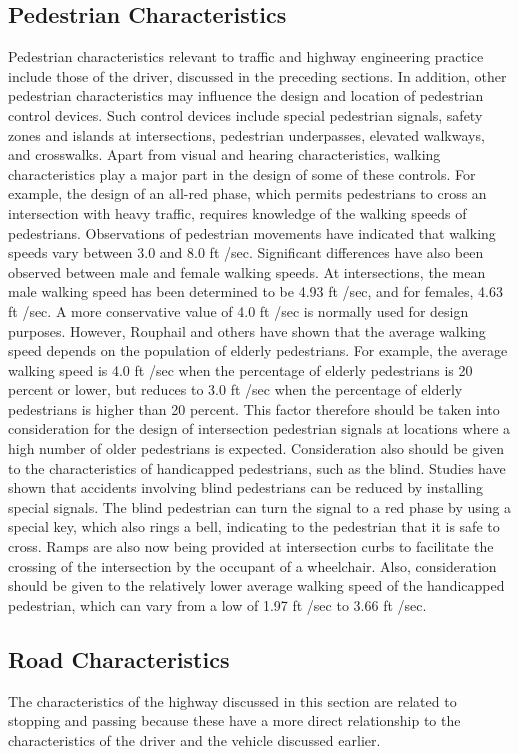 \subsection{Pedestrian Characteristics}
Pedestrian characteristics relevant to traffic and highway engineering practice include those of the driver, discussed in the preceding sections. In addition, other pedestrian characteristics may influence the design and location of pedestrian control devices. Such control devices include special pedestrian signals, safety zones and islands at intersections, pedestrian underpasses, elevated walkways, and crosswalks. Apart from visual and hearing characteristics, walking characteristics play a major part in the design of some of these controls. For example, the design of an all-red phase, which permits pedestrians to cross an intersection with heavy traffic, requires knowledge of the walking speeds of pedestrians. Observations of pedestrian movements have indicated that walking speeds vary between 3.0 and 8.0 ft /sec. Significant differences have also been observed between male and female walking speeds. At intersections, the mean male walking speed has been determined to be 4.93 ft /sec, and for females, 4.63 ft /sec. A more conservative value of 4.0 ft /sec is normally used for design purposes. However, Rouphail and others have shown that the average walking speed depends on the population of elderly pedestrians. For example, the average walking speed is 4.0 ft /sec when the percentage of elderly pedestrians is 20 percent or lower, but reduces to 3.0 ft /sec when the percentage of elderly pedestrians is higher than 20 percent. This factor therefore should be taken into consideration for the design of intersection pedestrian signals at locations where a high number of older pedestrians is expected. Consideration also should be given to the characteristics of handicapped pedestrians, such as the blind. Studies have shown that accidents involving blind pedestrians can be reduced by installing special signals. The blind pedestrian can turn the signal to a red phase by using a special key, which also rings a bell, indicating to the pedestrian that it is safe to cross. Ramps are also now being provided at intersection curbs to facilitate the crossing of the intersection by the occupant of a wheelchair. Also, consideration should be given to the relatively lower average walking speed of the handicapped pedestrian, which can vary from a low of 1.97 ft /sec to 3.66 ft /sec.\\
%
\subsection{Road Characteristics}
The characteristics of the highway discussed in this section are related to stopping and passing because these have a more direct relationship to the characteristics of the driver and the vehicle discussed earlier.
